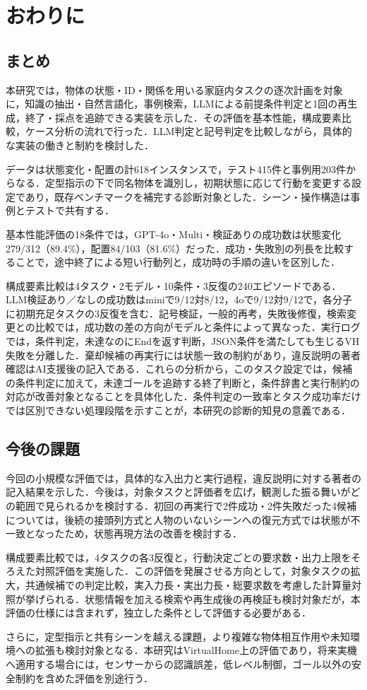 \section{おわりに}\label{sec6}
\subsection{まとめ}\label{sec6.1}
本研究では，物体の状態・ID・関係を用いる家庭内タスクの逐次計画を対象に，知識の抽出・自然言語化，事例検索，LLMによる前提条件判定と1回の再生成，終了・採点を追跡できる実装を示した．その評価を基本性能，構成要素比較，ケース分析の流れで行った．LLM判定と記号判定を比較しながら，具体的な実装の働きと制約を検討した．

データは状態変化・配置の計618インスタンスで，テスト415件と事例用203件からなる．定型指示の下で同名物体を識別し，初期状態に応じて行動を変更する設定であり，既存ベンチマークを補完する診断対象とした．シーン・操作構造は事例とテストで共有する．

基本性能評価の18条件では，GPT-4o・Multi・検証ありの成功数は状態変化279/312（89.4\%），配置84/103（81.6\%）だった．成功・失敗別の列長を比較することで，途中終了による短い行動列と，成功時の手順の違いを区別した．

構成要素比較は4タスク・2モデル・10条件・3反復の240エピソードである．LLM検証あり／なしの成功数はminiで9/12対8/12，4oで9/12対9/12で，各分子に初期充足タスクの3反復を含む．記号検証，一般的再考，失敗後修復，検索変更との比較では，成功数の差の方向がモデルと条件によって異なった．実行ログでは，条件判定，未達なのにEndを返す判断，JSON条件を満たしても生じるVH失敗を分離した．棄却候補の再実行には状態一致の制約があり，違反説明の著者確認はAI支援後の記入である．これらの分析から，このタスク設定では，候補の条件判定に加えて，未達ゴールを追跡する終了判断と，条件辞書と実行制約の対応が改善対象となることを具体化した．条件判定の一致率とタスク成功率だけでは区別できない処理段階を示すことが，本研究の診断的知見の意義である．


\subsection{今後の課題}\label{sec6.2}
今回の小規模な評価では，具体的な入出力と実行過程，違反説明に対する著者の記入結果を示した．今後は，対象タスクと評価者を広げ，観測した振る舞いがどの範囲で見られるかを検討する．初回の再実行で2件成功・2件失敗だった4候補については，後続の接頭列方式と人物のいないシーンへの復元方式では状態が不一致となったため，状態再現方法の改善を検討する．

構成要素比較では，4タスクの各3反復と，行動決定ごとの要求数・出力上限をそろえた対照評価を実施した．この評価を発展させる方向として，対象タスクの拡大，共通候補での判定比較，実入力長・実出力長・総要求数を考慮した計算量対照が挙げられる．状態情報を加える検索や再生成後の再検証も検討対象だが，本評価の仕様には含まれず，独立した条件として評価する必要がある．

さらに，定型指示と共有シーンを越える課題，より複雑な物体相互作用や未知環境への拡張も検討対象となる．本研究はVirtualHome上の評価であり，将来実機へ適用する場合には，センサーからの認識誤差，低レベル制御，ゴール以外の安全制約を含めた評価を別途行う．

